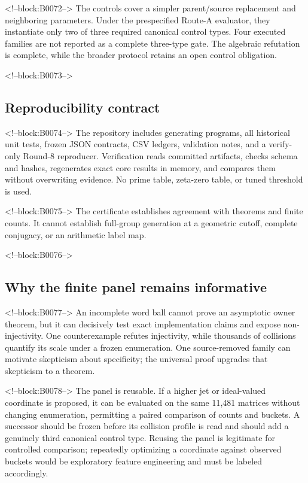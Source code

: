 \documentclass[11pt,a4paper]{article}
\theoremstyle{definition}
\theoremstyle{remark}
\begin{document}
<!--block:B0072-->
The controls cover a simpler parent/source replacement and neighboring parameters. Under the prespecified Route-A evaluator, they instantiate only two of three required canonical control types. Four executed families are not reported as a complete three-type gate. The algebraic refutation is complete, while the broader protocol retains an open control obligation.

<!--block:B0073-->
\subsection{Reproducibility contract}

<!--block:B0074-->
The repository includes generating programs, all historical unit tests, frozen JSON contracts, CSV ledgers, validation notes, and a verify-only Round-8 reproducer. Verification reads committed artifacts, checks schema and hashes, regenerates exact core results in memory, and compares them without overwriting evidence. No prime table, zeta-zero table, or tuned threshold is used.

<!--block:B0075-->
The certificate establishes agreement with theorems and finite counts. It cannot establish full-group generation at a geometric cutoff, complete conjugacy, or an arithmetic label map.

<!--block:B0076-->
\subsection{Why the finite panel remains informative}

<!--block:B0077-->
An incomplete word ball cannot prove an asymptotic owner theorem, but it can decisively test exact implementation claims and expose non-injectivity. One counterexample refutes injectivity, while thousands of collisions quantify its scale under a frozen enumeration. One source-removed family can motivate skepticism about specificity; the universal proof upgrades that skepticism to a theorem.

<!--block:B0078-->
The panel is reusable. If a higher jet or ideal-valued coordinate is proposed, it can be evaluated on the same 11,481 matrices without changing enumeration, permitting a paired comparison of counts and buckets. A successor should be frozen before its collision profile is read and should add a genuinely third canonical control type. Reusing the panel is legitimate for controlled comparison; repeatedly optimizing a coordinate against observed buckets would be exploratory feature engineering and must be labeled accordingly.
\end{document}
